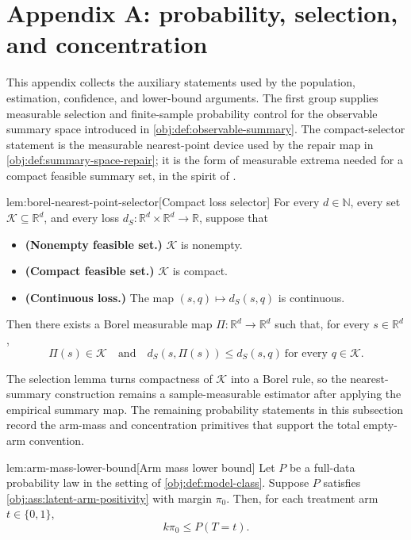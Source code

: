 \section{Appendix A: probability, selection, and concentration}

This appendix collects the auxiliary statements used by the population, estimation, confidence, and lower-bound arguments. The first group supplies measurable selection and finite-sample probability control for the observable summary space introduced in \cref{obj:def:observable-summary}. The compact-selector statement is the measurable nearest-point device used by the repair map in \cref{obj:def:summary-space-repair}; it is the form of measurable extrema needed for a compact feasible summary set, in the spirit of \citet{BrownPurves1973}.

\begin{lemmav}{lem:borel-nearest-point-selector}[Compact loss selector]
For every \(d\in\mathbb N\), every set \(\mathcal K\subseteq \mathbb R^d\), and every loss \(d_S:\mathbb R^d\times\mathbb R^d\to\mathbb R\), suppose that
\begin{itemize}
\item \textbf{(Nonempty feasible set.)} \(\mathcal K\) is nonempty.
\item \textbf{(Compact feasible set.)} \(\mathcal K\) is compact.
\item \textbf{(Continuous loss.)} The map \((s,q)\mapsto d_S(s,q)\) is continuous.
\end{itemize}
Then there exists a Borel measurable map \(\Pi:\mathbb R^d\to\mathbb R^d\) such that, for every \(s\in\mathbb R^d\),
\[
\Pi(s)\in\mathcal K
\quad\text{and}\quad
d_S(s,\Pi(s))\le d_S(s,q)\ \text{for every }q\in\mathcal K .
\]
\end{lemmav}

The selection lemma turns compactness of \(\mathcal K\) into a Borel rule, so the nearest-summary construction remains a sample-measurable estimator after applying the empirical summary map. The remaining probability statements in this subsection record the arm-mass and concentration primitives that support the total empty-arm convention.

\begin{lemmav}{lem:arm-mass-lower-bound}[Arm mass lower bound]
Let \(P\) be a full-data probability law in the setting of \cref{obj:def:model-class}. Suppose \(P\) satisfies \cref{obj:ass:latent-arm-positivity} with margin \(\pi_0\). Then, for each treatment arm \(t\in\{0,1\}\),
\[
k\pi_0 \le P(T=t).
\]
\end{lemmav}

